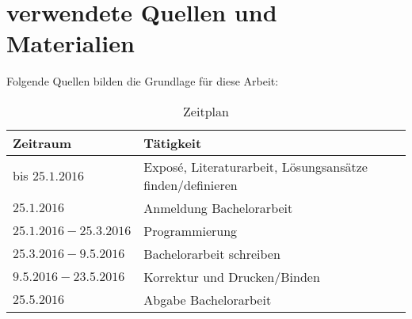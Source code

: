 \documentclass[a4,abstract=on]{scrartcl}
\begin{document}
\section{verwendete Quellen und Materialien}
Folgende Quellen bilden die Grundlage für diese Arbeit:

\begingroup
			\renewcommand{\section}[2]{}
			
			
		\endgroup

\clearpage
\section{Zeitplan der Bachelorarbeit}
\noindent
\begin{table}[h]
  \begin{tabular}{|l|l|}
	\hline
   \textbf{Zeitraum} & \textbf{Tätigkeit}\\
	\hline
   bis $25.1.2016$ & Exposé, Literaturarbeit, Lösungsansätze finden/definieren \\
	\hline
  $25.1.2016$ & Anmeldung Bachelorarbeit\\
	\hline
  $25.1.2016 - 25.3.2016$ & Programmierung\\
	\hline
  $25.3.2016 - 9.5.2016$ & Bachelorarbeit schreiben\\
	\hline
   $9.5.2016 - 23.5.2016$ & Korrektur und Drucken/Binden \\
	\hline
   $25.5.2016$ & Abgabe Bachelorarbeit\\
	\hline
  \end{tabular}
  \caption{Zeitplan}
  \end{table}
\end{document}
